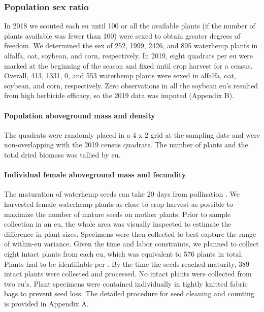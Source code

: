 \documentclass[
]{article}
\begin{document}
\hypertarget{population-sex-ratio}{%
\subsubsection*{Population sex ratio}\label{population-sex-ratio}}

In 2018 we scouted each eu until 100 or all the available plants (if the number of plants available was fewer than 100) were sexed to obtain greater degrees of freedom. We determined the sex of 252, 1999, 2426, and 895 waterhemp plants in alfalfa, oat, soybean, and corn, respectively. In 2019, eight quadrats per eu were marked at the beginning of the season and fixed until crop harvest for a census. Overall, 413, 1331, 0, and 553 waterhemp plants were sexed in alfalfa, oat, soybean, and corn, respectively. Zero observations in all the soybean eu's resulted from high herbicide efficacy, so the 2019 data was imputed (Appendix B).

\hypertarget{population-aboveground-mass-and-density}{%
\paragraph{Population aboveground mass and density}\label{population-aboveground-mass-and-density}}

The quadrats were randomly placed in a 4 x 2 grid at the sampling date and were non-overlapping with the 2019 census quadrats. The number of plants and the total dried biomass was tallied by eu.

\hypertarget{individual-female-aboveground-mass-and-fecundity}{%
\paragraph{Individual female aboveground mass and fecundity}\label{individual-female-aboveground-mass-and-fecundity}}

The maturation of waterhemp seeds can take 20 days from pollination \citep{bellTimeRequirementPollination2010}.
We harvested female waterhemp plants as close to crop harvest as possible to maximize the number of mature seeds on mother plants. Prior to sample collection in an eu, the whole area was visually inspected to estimate the difference in plant sizes. Specimens were then collected to best capture the range of within-eu variance.
Given the time and labor constraints, we planned to collect eight intact plants from each eu, which was equivalent to 576 plants in total. Plants had to be identifiable per \citet{uvaWeedsNortheast1997}. By the time the seeds reached maturity, 389 intact plants were collected and processed. No intact plants were collected from two eu's.
Plant specimens were contained individually in tightly knitted fabric bags to prevent seed loss. The detailed procedure for seed cleaning and counting is provided in Appendix A.
\end{document}
